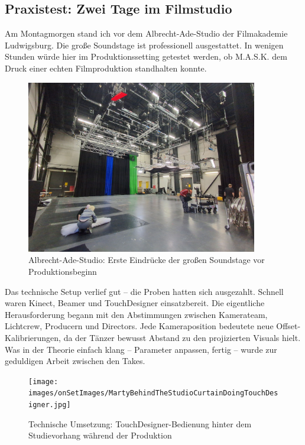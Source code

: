 \subsection{Praxistest: Zwei Tage im Filmstudio}

Am Montagmorgen stand ich vor dem Albrecht-Ade-Studio der Filmakademie Ludwigsburg. Die große Soundstage ist professionell ausgestattet. In wenigen Stunden würde hier im Produktionssetting getestet werden, ob M.A.S.K. dem Druck einer echten Filmproduktion standhalten konnte.

\begin{figure}[h]
   \centering
   \includegraphics[width=0.9\textwidth]{images/onSetImages/InsideWideshotAlbrechtAdeStudio.jpg}
   \caption{Albrecht-Ade-Studio: Erste Eindrücke der großen Soundstage vor Produktionsbeginn}
   \label{fig:studio_interior}
\end{figure}

Das technische Setup verlief gut – die Proben hatten sich ausgezahlt. Schnell waren Kinect, Beamer und TouchDesigner einsatzbereit. Die eigentliche Herausforderung begann mit den Abstimmungen zwischen Kamerateam, Lichtcrew, Producern und Directors. Jede Kameraposition bedeutete neue Offset-Kalibrierungen, da der Tänzer bewusst Abstand zu den projizierten Visuals hielt. Was in der Theorie einfach klang – Parameter anpassen, fertig – wurde zur geduldigen Arbeit zwischen den Takes.

\begin{figure}[h]
   \centering
   \texttt{[image: images/onSetImages/MartyBehindTheStudioCurtainDoingTouchDesigner.jpg]}
   \caption{Technische Umsetzung: TouchDesigner-Bedienung hinter dem Studievorhang während der Produktion}
   \label{fig:technical_operation}
\end{figure}

